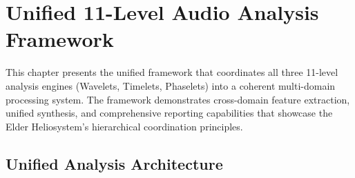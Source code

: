 \chapter{Unified 11-Level Audio Analysis Framework}

\begin{tcolorbox}[colback=DarkSkyBlue!5!white,colframe=DarkSkyBlue!75!black,title=Chapter Overview]
This chapter presents the unified framework that coordinates all three 11-level analysis engines (Wavelets, Timelets, Phaselets) into a coherent multi-domain processing system. The framework demonstrates cross-domain feature extraction, unified synthesis, and comprehensive reporting capabilities that showcase the Elder Heliosystem's hierarchical coordination principles.
\end{tcolorbox}

\section{Unified Analysis Architecture}

